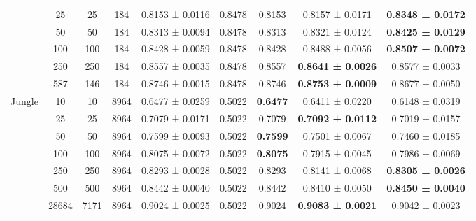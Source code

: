 \begin{table}
{\begin{tabular}[H]{@{}lcccccccc@{}}
                              & 25    & 25   & 184  & 0.8153 ± 0.0116      & 0.8478                & 0.8153          & 0.8157 ± 0.0171          & \textbf{0.8348 ± 0.0172} \\
                              & 50    & 50   & 184  & 0.8313 ± 0.0094      & 0.8478                & 0.8313          & 0.8321 ± 0.0124          & \textbf{0.8425 ± 0.0129} \\
                              & 100   & 100  & 184  & 0.8428 ± 0.0059      & 0.8478                & 0.8428          & 0.8488 ± 0.0056          & \textbf{0.8507 ± 0.0072} \\
                              & 250   & 250  & 184  & 0.8557 ± 0.0035      & 0.8478                & 0.8557          & \textbf{0.8641 ± 0.0026} & 0.8577 ± 0.0033          \\
                              & 587   & 146  & 184  & 0.8746 ± 0.0015      & 0.8478                & 0.8746          & \textbf{0.8753 ± 0.0009} & 0.8677 ± 0.0050          \\
                              \midrule
\multirow{7}{*}{Jungle}       & 10    & 10   & 8964 & 0.6477 ± 0.0259      & 0.5022                & \textbf{0.6477} & 0.6411 ± 0.0220          & 0.6148 ± 0.0319          \\
                              & 25    & 25   & 8964 & 0.7079 ± 0.0171      & 0.5022                & 0.7079          & \textbf{0.7092 ± 0.0112} & 0.7019 ± 0.0157          \\
                              & 50    & 50   & 8964 & 0.7599 ± 0.0093      & 0.5022                & \textbf{0.7599} & 0.7501 ± 0.0067          & 0.7460 ± 0.0185          \\
                              & 100   & 100  & 8964 & 0.8075 ± 0.0072      & 0.5022                & \textbf{0.8075} & 0.7915 ± 0.0045          & 0.7986 ± 0.0069          \\
                              & 250   & 250  & 8964 & 0.8293 ± 0.0028      & 0.5022                & 0.8293          & 0.8141 ± 0.0068          & \textbf{0.8305 ± 0.0026} \\
                              & 500   & 500  & 8964 & 0.8442 ± 0.0040      & 0.5022                & 0.8442          & 0.8410 ± 0.0050          & \textbf{0.8450 ± 0.0040} \\
                              & 28684 & 7171 & 8964 & 0.9024 ± 0.0025      & 0.5022                & 0.9024          & \textbf{0.9083 ± 0.0021} & 0.9042 ± 0.0023   \\      
\bottomrule
\end{tabular}}
\end{table}


